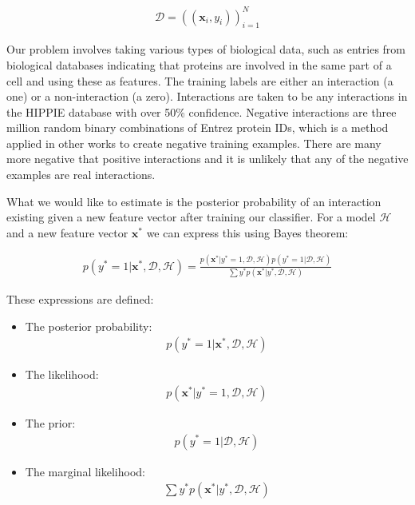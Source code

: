 \begin{align}
    \mathcal{D} = \left( ( \pmb{x}_{i}, y_{i} ) \right)_{i=1}^{N}
\end{align}


Our problem involves taking various types of biological data, such as entries from biological databases indicating that proteins are involved in the same part of a cell and using these as features.
The training labels are either an interaction (a one) or a non-interaction (a zero).
Interactions are taken to be any interactions in the HIPPIE\autocite{schaefer_hippie:_2012} database with over 50\% confidence.
Negative interactions are three million random binary combinations of Entrez protein IDs, which is a method applied in other works\autocite{qi_evaluation_2006} to create negative training examples.
There are many more negative that positive interactions and it is unlikely that any of the negative examples are real interactions.

What we would like to estimate is the posterior probability of an interaction existing given a new feature vector after training our classifier.
For a model $\mathcal{H}$ and a new feature vector $\pmb{x}^{*}$ we can express this using Bayes theorem:

\begin{align}
    p(y^{*} = 1 | \pmb{x}^{*}, \mathcal{D}, \mathcal{H}) = \frac{ p(\pmb{x}^{*}| y^{*} = 1 , \mathcal{D}, \mathcal{H}) p( y^{*} = 1 | \mathcal{D}, \mathcal{H})}{ \sum{y^{*}} p( \pmb{x}^{*} | y^{*}, \mathcal{D}, \mathcal{H})}
\end{align}

These expressions are defined:

\begin{itemize}
    \item The posterior probability:
        \begin{align}
            p(y^{*} = 1 | \pmb{x}^{*}, \mathcal{D}, \mathcal{H})
        \end{align}
    \item The likelihood:
        \begin{align}
            p(\pmb{x}^{*}| y^{*} = 1 , \mathcal{D}, \mathcal{H})
        \end{align}
    \item The prior:
        \begin{align}
            p( y^{*} = 1 | \mathcal{D}, \mathcal{H})
        \end{align}
    \item The marginal likelihood:
        \begin{align}
            \sum{y^{*}} p( \pmb{x}^{*} | y^{*}, \mathcal{D}, \mathcal{H})
        \end{align}
\end{itemize}

